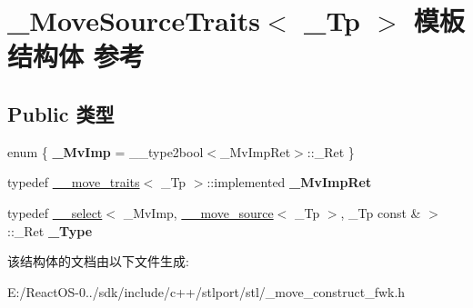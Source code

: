 \hypertarget{struct___move_source_traits}{}\section{\+\_\+\+Move\+Source\+Traits$<$ \+\_\+\+Tp $>$ 模板结构体 参考}
\label{struct___move_source_traits}
\subsection*{Public 类型}
\begin{DoxyCompactItemize}
\item 
\mbox{\label{struct___move_source_traits_a98c868c8adabb36df6493e580c791363}} 
enum \{ {\bfseries \+\_\+\+Mv\+Imp} = \+\_\+\+\_\+type2bool$<$\+\_\+\+Mv\+Imp\+Ret$>$\+:\+:\+\_\+\+Ret
 \}
\item 
\mbox{\label{struct___move_source_traits_a3205e267728a2350a1476f8c96b86062}} 
typedef \hyperlink{struct____move__traits}{\+\_\+\+\_\+move\+\_\+traits}$<$ \+\_\+\+Tp $>$\+::implemented {\bfseries \+\_\+\+Mv\+Imp\+Ret}
\item 
\mbox{\label{struct___move_source_traits_a46b0ad43e38559f6e997c137b41ec5c7}} 
typedef \hyperlink{struct____select}{\+\_\+\+\_\+select}$<$ \+\_\+\+Mv\+Imp, \hyperlink{class____move__source}{\+\_\+\+\_\+move\+\_\+source}$<$ \+\_\+\+Tp $>$, \+\_\+\+Tp const  \& $>$\+::\+\_\+\+Ret {\bfseries \+\_\+\+Type}
\end{DoxyCompactItemize}


该结构体的文档由以下文件生成\+:\begin{DoxyCompactItemize}
\item 
E\+:/\+React\+O\+S-\/0../sdk/include/c++/stlport/stl/\+\_\+move\+\_\+construct\+\_\+fwk.\+h\end{DoxyCompactItemize}
